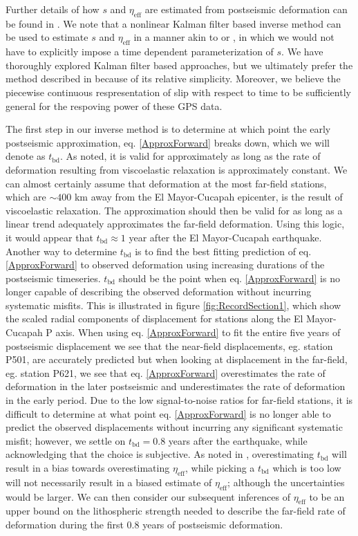 \documentclass[1p]{elsarticle}
\begin{document}
Further details of how $s$ and $\eta_\mathrm{eff}$ are estimated from postseismic deformation can be found in \citet{Hines2015}.  We note that a nonlinear Kalman filter based inverse method can be used to estimate $s$ and $\eta_{\mathrm{eff}}$ in a manner akin to \citet{Segall1997} or \citet{McGuire2003}, in which we would not have to explicitly impose a time dependent parameterization of $s$. We have thoroughly explored Kalman filter based approaches, but we ultimately prefer the method described in \citet{Hines2015} because of its relative simplicity. Moreover, we believe the piecewise continuous respresentation of slip with respect to time to be sufficiently general for the respoving power of these GPS data.

The first step in our inverse method is to determine at which point the early postseismic approximation, eq. \ref{ApproxForward} breaks down, which we will denote as $t_{\mathrm{bd}}$.  As noted, it is valid for approximately as long as the rate of deformation resulting from viscoelastic relaxation is approximately constant. We can almost certainly assume that deformation at the most far-field stations, which are $\sim400$ km away from the El Mayor-Cucapah epicenter, is the result of viscoelastic relaxation. The approximation should then be valid for as long as a linear trend adequately approximates the far-field deformation. Using this logic, it would appear that $t_{\mathrm{bd}}\approx1$ year after the El Mayor-Cucapah earthquake.  Another way to determine $t_{\mathrm{bd}}$ is to find the best fitting prediction of eq. \ref{ApproxForward} to observed deformation using increasing durations of the postseismic timeseries.  $t_\mathrm{bd}$ should be the point when eq. \ref{ApproxForward} is no longer capable of describing the observed deformation without incurring systematic misfits.  This is illustrated in figure \ref{fig:RecordSection1}, which show the scaled radial components of displacement for stations along the El Mayor-Cucapah P axis.  When using eq. \ref{ApproxForward} to fit the entire five years of postseismic displacement we see that the near-field displacements, eg. station P501, are accurately predicted but when looking at displacement in the far-field, eg. station P621, we see that eq. \ref{ApproxForward} overestimates the rate of deformation in the later postseismic and underestimates the rate of deformation in the early period.  Due to the low signal-to-noise ratios for far-field stations, it is difficult to determine at what point eq. \ref{ApproxForward} is no longer able to predict the observed displacements without incurring any significant systematic misfit; however, we settle on $t_{\mathrm{bd}}=0.8$ years after the earthquake, while acknowledging that the choice is subjective. As noted in \cite{Hines2015}, overestimating $t_{\mathrm{bd}}$ will result in a bias towards overestimating $\eta_{\mathrm{eff}}$, while picking a $t_\mathrm{bd}$ which is too low will not necessarily result in a biased estimate of $\eta_\mathrm{eff}$; although the uncertainties would be larger. We can then consider our subsequent inferences of $\eta_{\mathrm{eff}}$ to be an upper bound on the lithospheric strength needed to describe the far-field rate of deformation during the first 0.8 years of postseismic deformation. 
\end{document}
